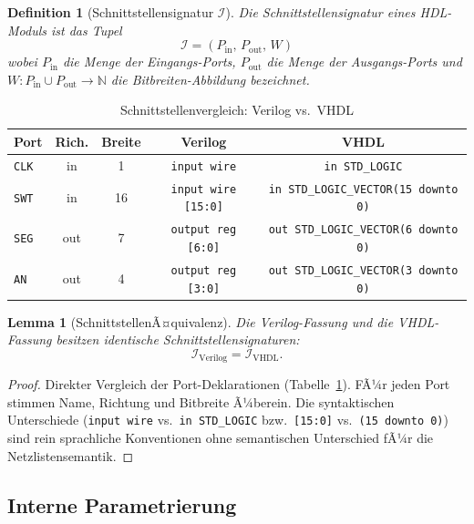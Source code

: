 ﻿\documentclass[12pt,a4paper]{report}
\newtheorem{definition}{Definition}[section]
\newtheorem{lemma}[theorem]{Lemma}
\begin{document}
\begin{definition}[Schnittstellensignatur $\mathcal{I}$]
	\label{def:schnittstellensignatur}
	Die Schnittstellensignatur eines HDL-Moduls ist das Tupel
	\[
	\mathcal{I} = (P_\mathrm{in},\, P_\mathrm{out},\, W)
	\]
	wobei $P_\mathrm{in}$ die Menge der Eingangs-Ports, $P_\mathrm{out}$ die Menge
	der Ausgangs-Ports und $W : P_\mathrm{in} \cup P_\mathrm{out} \to \mathbb{N}$
	die Bitbreiten-Abbildung bezeichnet.
\end{definition}

\begin{table}
	\centering
	\begin{tabular}{|l|c|c|c|c|}
		\hline
		\textbf{Port} & \textbf{Rich.} & \textbf{Breite} & \textbf{Verilog} & \textbf{VHDL} \\
		\hline
		\texttt{CLK}  & in  & 1  & \texttt{input wire}               & \texttt{in STD\_LOGIC} \\
		\texttt{SWT}  & in  & 16 & \texttt{input wire [15:0]}        & \texttt{in STD\_LOGIC\_VECTOR(15 downto 0)} \\
		\texttt{SEG}  & out & 7  & \texttt{output reg [6:0]}         & \texttt{out STD\_LOGIC\_VECTOR(6 downto 0)} \\
		\texttt{AN}   & out & 4  & \texttt{output reg [3:0]}         & \texttt{out STD\_LOGIC\_VECTOR(3 downto 0)} \\
		\hline
	\end{tabular}
	\caption{Schnittstellenvergleich: Verilog vs.\ VHDL}
	\label{tab:schnittstelle}
\end{table}

\begin{lemma}[SchnittstellenÃ¤quivalenz]
	\label{lem:schnittstellen_equiv}
	Die Verilog-Fassung und die VHDL-Fassung besitzen identische Schnittstellensignaturen:
	\[
	\mathcal{I}_\mathrm{Verilog} = \mathcal{I}_\mathrm{VHDL}.
	\]
\end{lemma}

\begin{proof}
	Direkter Vergleich der Port-Deklarationen (Tabelle~\ref{tab:schnittstelle}).
	FÃ¼r jeden Port stimmen Name, Richtung und Bitbreite Ã¼berein.  Die syntaktischen
	Unterschiede (\texttt{input wire} vs.\ \texttt{in STD\_LOGIC} bzw.\
	\texttt{[15:0]} vs.\ \texttt{(15 downto 0)}) sind rein sprachliche Konventionen
	ohne semantischen Unterschied fÃ¼r die Netzlistensemantik.
\end{proof}

\subsection{Interne Parametrierung}
\end{document}
